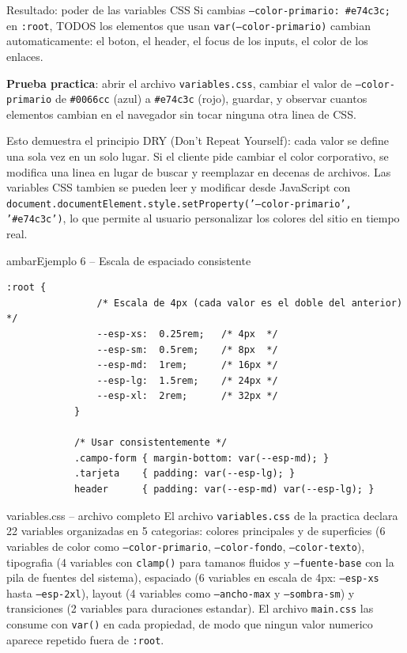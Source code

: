 \documentclass[11pt,a4paper]{article}
\begin{document}
	\begin{cajaresultado}{Resultado: poder de las variables CSS}
		Si cambias \texttt{--color-primario: \#e74c3c;} en \texttt{:root}, TODOS los elementos que usan \texttt{var(--color-primario)} cambian automaticamente: el boton, el header, el focus de los inputs, el color de los enlaces.
		
		\textbf{Prueba practica}: abrir el archivo \texttt{variables.css}, cambiar el valor de \texttt{--color-primario} de \texttt{\#0066cc} (azul) a \texttt{\#e74c3c} (rojo), guardar, y observar cuantos elementos cambian en el navegador sin tocar ninguna otra linea de CSS.
		
		Esto demuestra el principio DRY (Don't Repeat Yourself): cada valor se define una sola vez en un solo lugar. Si el cliente pide cambiar el color corporativo, se modifica una linea en lugar de buscar y reemplazar en decenas de archivos. Las variables CSS tambien se pueden leer y modificar desde JavaScript con \texttt{document.documentElement.style.setProperty('--color-primario', '\#e74c3c')}, lo que permite al usuario personalizar los colores del sitio en tiempo real.
	\end{cajaresultado}
	
	\begin{cajacodigo}{ambar}{Ejemplo 6 -- Escala de espaciado consistente}
		\begin{lstlisting}[style=codecss]
			:root {
				/* Escala de 4px (cada valor es el doble del anterior) */
				--esp-xs:  0.25rem;   /* 4px  */
				--esp-sm:  0.5rem;    /* 8px  */
				--esp-md:  1rem;      /* 16px */
				--esp-lg:  1.5rem;    /* 24px */
				--esp-xl:  2rem;      /* 32px */
			}
			
			/* Usar consistentemente */
			.campo-form { margin-bottom: var(--esp-md); }
			.tarjeta    { padding: var(--esp-lg); }
			header      { padding: var(--esp-md) var(--esp-lg); }
		\end{lstlisting}
	\end{cajacodigo}
	
	\begin{cajapractica}{variables.css -- archivo completo}
		El archivo \texttt{variables.css} de la practica declara 22 variables organizadas en 5 categorias: colores principales y de superficies (6 variables de color como \texttt{--color-primario}, \texttt{--color-fondo}, \texttt{--color-texto}), tipografia (4 variables con \texttt{clamp()} para tamanos fluidos y \texttt{--fuente-base} con la pila de fuentes del sistema), espaciado (6 variables en escala de 4px: \texttt{--esp-xs} hasta \texttt{--esp-2xl}), layout (4 variables como \texttt{--ancho-max} y \texttt{--sombra-sm}) y transiciones (2 variables para duraciones estandar). El archivo \texttt{main.css} las consume con \texttt{var()} en cada propiedad, de modo que ningun valor numerico aparece repetido fuera de \texttt{:root}.
	\end{cajapractica}
	
\end{document}
